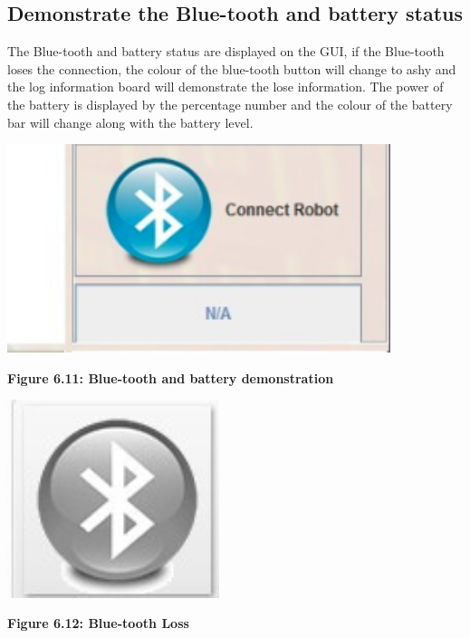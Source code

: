 \documentclass[11pt, a4paper]{report}
\begin{document}
\subsection{Demonstrate the Blue-tooth and battery status}
The Blue-tooth and battery status are displayed on the GUI, if the Blue-tooth loses the connection, the colour of the blue-tooth button will change to ashy and the log information board will demonstrate the lose information. The power of the battery is displayed by the percentage number and the colour of the battery bar will change along with the battery level.
 \begin{center}
 \includegraphics[width=11.20cm]{bluetooth_battery}
\end{center}
\begin{center}
\textbf {Figure 6.11: Blue-tooth and battery demonstration } \\[0.3cm]
\end{center}
 \begin{center}
 \includegraphics[width=6.20cm]{connectionloss.jpg}
\end{center}
\begin{center}
\textbf {Figure 6.12: Blue-tooth Loss } \\[0.3cm]
\end{center}
\end{document}
